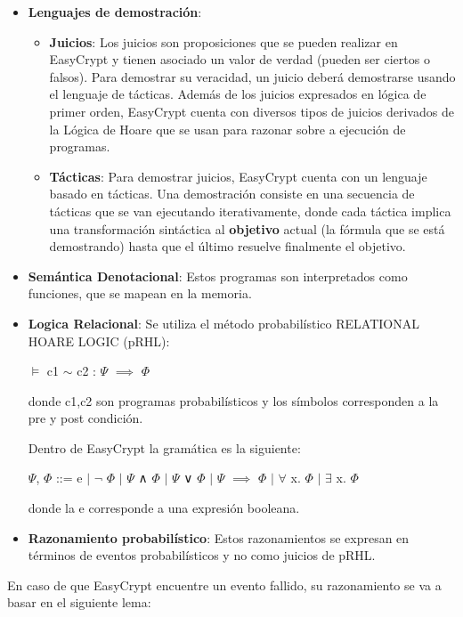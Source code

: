 \documentclass[runningheads,a4paper]{llncs}
\begin{document}
\begin{itemize}
	\item \textbf{Lenguajes de demostración}:
\begin{itemize}
		\item \textbf{Juicios}:
Los juicios son proposiciones que se pueden realizar en EasyCrypt y tienen asociado un valor de verdad (pueden ser ciertos o falsos). Para demostrar su veracidad, un juicio deberá demostrarse usando el lenguaje de tácticas. Además de los juicios expresados en lógica de primer orden, EasyCrypt cuenta con diversos tipos de juicios derivados de la Lógica de Hoare que se usan para razonar sobre a ejecución de programas.  
		\item \textbf{Tácticas}:
Para demostrar juicios, EasyCrypt cuenta con un lenguaje basado en tácticas. Una demostración consiste en una secuencia de tácticas que se van ejecutando iterativamente, donde cada táctica implica una transformación sintáctica al \textbf{objetivo} actual (la fórmula que se está demostrando) hasta que el último resuelve finalmente el objetivo.
\end{itemize}

	\item \textbf{Semántica Denotacional}:
Estos programas son interpretados como funciones, que se mapean en la memoria.

	\item \textbf{Logica Relacional}: Se utiliza el método probabilístico RELATIONAL HOARE LOGIC (pRHL):
		
\centerline{$\models$ c1 $\sim$ c2 : $\Psi$ $\implies$ $\Phi$}	
			
donde c1,c2 son programas probabilísticos y los símbolos corresponden a la pre y post condición.

Dentro de EasyCrypt la gramática es la siguiente:

\centerline{$\Psi$, $\Phi$ ::= e $\mid$ $\neg$ $\Phi$ $\mid$ $\Psi$ ∧ $\Phi$ $\mid$ $\Psi$ ∨ $\Phi$ $\mid$ $\Psi$ $\implies$ $\Phi$ $\mid$ $\forall$ x. $\Phi$ $\mid$ $\exists$ x. $\Phi$}

donde la e corresponde a una expresión booleana.


	\item \textbf{Razonamiento probabilístico}:
Estos razonamientos se expresan en términos de eventos probabilísticos y no como juicios de pRHL.\cite{article3}

\end{itemize}
En caso de que EasyCrypt encuentre un evento fallido, su razonamiento se va a basar en el siguiente lema:
\end{document}

